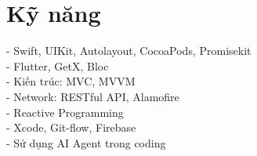 \documentclass[letterpaper,11pt]{article}
\newcommand{\resumeSubHeadingListStart}{\begin{itemize}[leftmargin=0.15in, label={}]}
\newcommand{\resumeSubHeadingListEnd}{\end{itemize}}
\begin{document}
\section{Kỹ năng}
  \vspace{2pt}
  \resumeSubHeadingListStart
    \small{\item{
        - Swift, UIKit, Autolayout, CocoaPods, Promisekit \\ \vspace{3pt}
        - Flutter, GetX, Bloc \\ \vspace{3pt}
        - Kiến trúc: MVC, MVVM \\ \vspace{3pt}
        - Network: RESTful API, Alamofire \\ \vspace{3pt}
        - Reactive Programming \\ \vspace{3pt}
        - Xcode, Git-flow, Firebase \\ \vspace{3pt}
        - Sử dụng AI Agent trong coding
        
        
        
    }}
  \resumeSubHeadingListEnd



\end{document}

